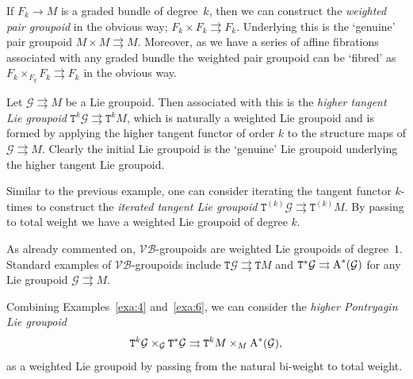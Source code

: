 \documentclass[10pt,a4paper]{amsart}
\newcommand{\rmA}{\textnormal{A}}
\def\sT{{\mathtt T}}
\numberwithin{equation}{section}
\begin{document}
\begin{Example}\label{exa:3}
If $F_{k} \rightarrow M$ is a graded bundle of degree~$k$, then we can construct the \emph{weighted pair groupoid} in the obvious way; $F_{k}\times F_{k} \rightrightarrows F_{k}$. Underlying this is the `genuine' pair groupoid $M \times M \rightrightarrows M$. Moreover, as we have a series of af\/f\/ine f\/ibrations associated with any graded bundle the weighted pair groupoid can be `f\/ibred' as $F_{k}\times_{F_{q}} F_{k} \rightrightarrows F_{k}$ in the obvious way.
\end{Example}

\begin{Example}\label{exa:4}
Let $\mathcal{G} \rightrightarrows M$ be a Lie groupoid. Then associated with this is the \emph{higher tangent Lie groupoid}  $\sT^{k}\mathcal{G} \rightrightarrows \sT^{k}M$, which is naturally a weighted Lie groupoid and is formed by applying the higher tangent functor of order $k$ to the structure maps of $\mathcal{G} \rightrightarrows M$. Clearly the initial Lie groupoid is the `genuine' Lie groupoid underlying the higher tangent Lie groupoid.
\end{Example}


\begin{Example}\label{exa:5}
Similar to the previous example, one can consider iterating  the tangent functor $k$-times to construct the \emph{iterated tangent Lie groupoid} $\sT^{(k)}\mathcal{G}\rightrightarrows \sT^{(k)}M$. By passing to total weight we have a weighted Lie groupoid of degree $k$.
\end{Example}

\begin{Example}\label{exa:6}
As already commented on,  $\mathcal{VB}$-groupoids are weighted Lie groupoids of degree~$1$.  Standard examples of $\mathcal{VB}$-groupoids include $\sT \mathcal{G} \rightrightarrows \sT M$ and $\sT^{*}\mathcal{G} \rightrightarrows \textnormal{A}^{*}(\mathcal{G})$ for any Lie groupoid $\mathcal{G} \rightrightarrows M$.
\end{Example}

\begin{Example}\label{exa:7}
Combining Examples~\ref{exa:4} and~\ref{exa:6}, we can consider the \emph{higher Pontryagin Lie groupoid}
\begin{gather*}
\sT^{k}\mathcal{G} \times_{\mathcal{G}} \sT^{*}\mathcal{G} \rightrightarrows \sT^{k}M \times_{M} \rmA^{*}(\mathcal{G}),
\end{gather*}
 as a weighted Lie groupoid by passing from the natural bi-weight to total weight.
\end{Example}
\end{document}
